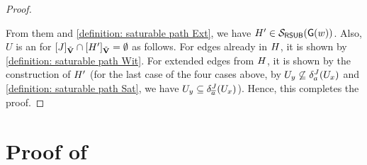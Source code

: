 \begin{proof}
\begin{itemize}
\end{itemize}
From them and \ref{definition: saturable path Ext}, we have $\graph[2]' \in \FillS_{\RSUB}(\const{\graph}(\word))$.
Also, $U$ is an  for $\ljump{\graph[3]}_{\tilde{\vsig}} \cap \ljump{\graph[2]'}_{\tilde{\vsig}} = \emptyset$ as follows.
For edges already in $\graph[2]$, it is shown by \ref{definition: saturable path Wit}.
For extended edges from $\graph[2]$, it is shown by the construction of $\graph[2]'$ (for the last case of the four cases above, by $U_{y} \not\subseteq \delta_{a}^{\graph[3]}(U_{x})$ and \ref{definition: saturable path Sat}, we have $U_{y} \subseteq \delta_{\com{a}}^{\graph[3]}(U_{x})$).
Hence, this completes the proof.
\end{proof}


\section{Proof of }\label{section: lemma: sound and completeness}

